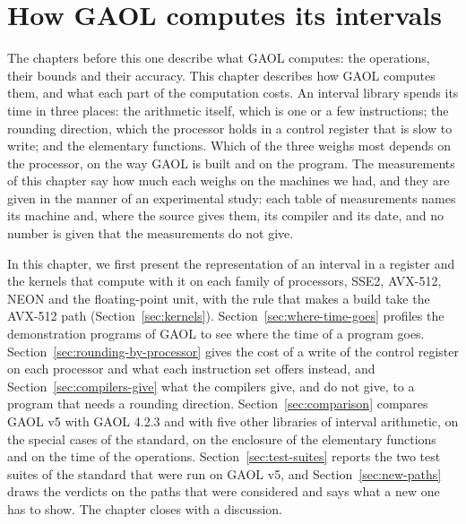 \documentclass[12pt,a4paper,twoside,openright]{book}
\begin{document}
\chapter{How GAOL computes its intervals}\label{chap:computing}

The chapters before this one describe what GAOL computes: the operations,
their bounds and their accuracy. This chapter describes how GAOL computes
them, and what each part of the computation costs. An interval library
spends its time in three places: the arithmetic itself, which is one or a
few instructions; the rounding direction, which the processor holds in a
control register that is slow to write; and the elementary functions. Which
of the three weighs most depends on the processor, on the way GAOL is built
and on the program. The measurements of this chapter say how much each
weighs on the machines we had, and they are given in the manner of an
experimental study: each table of measurements names its machine and, where the source gives them, its compiler and its date,
and no number is given that the measurements do not give.

\medskip
In this chapter, we first present the representation of an interval in a
register and the kernels that compute with it on each family of processors,
SSE2, AVX-512, NEON and the floating-point unit, with the rule that makes a
build take the AVX-512 path (Section~\ref{sec:kernels}).
Section~\ref{sec:where-time-goes} profiles the demonstration programs of GAOL
to see where the time of a program goes.
Section~\ref{sec:rounding-by-processor} gives the cost of a write of the
control register on each processor and what each instruction set offers
instead, and Section~\ref{sec:compilers-give} what the compilers give, and
do not give, to a program that needs a rounding direction.
Section~\ref{sec:comparison} compares GAOL v5 with GAOL 4.2.3 and with five
other libraries of interval arithmetic, on the special cases of the standard,
on the enclosure of the elementary functions and on the time of the
operations. Section~\ref{sec:test-suites} reports the two test suites of the
standard that were run on GAOL v5, and Section~\ref{sec:new-paths} draws the
verdicts on the paths that were considered and says what a new one has to
show. The chapter closes with a discussion.
\end{document}
